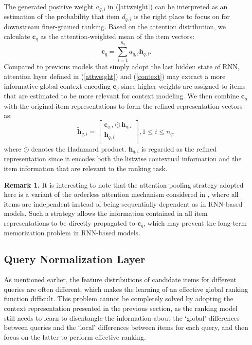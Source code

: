\documentclass[letterpaper]{article}
\begin{document}
The generated positive weight ${{a}_{q,i}}$ in (\ref{attweight}) can be interpreted as an estimation of the probability that item ${{d}_{q,i}}$ is the right place to focus on for downstream finer-grained ranking. Based on the attention distribution, we calculate ${{\mathbf{c}}_{q}}$ as the attention-weighted mean of the item vectors:
\begin{equation}
\label{context}
{{\mathbf{c}}_{q}}=\sum\limits_{i=1}^{{{n}_{q}}}{{{a}_{q,i}}{{\mathbf{h}}_{q,i}}}.
\end{equation}
Compared to previous models that simply adopt the last hidden state of RNN, attention layer defined in (\ref{attweight}) and (\ref{context}) may extract a more informative global context encoding ${{\mathbf{c}}_{q}}$ since higher weights are assigned to items that are estimated to be more relevant for context modeling. We then combine ${{\mathbf{c}}_{q}}$ with the original item representations to form the refined representation vectors as:
\begin{equation}
\label{latentcross}
{{\widetilde{\mathbf{h}}}_{q,i}}=\left[ \begin{matrix}
{\mathbf{c}_{q,i}}\odot{{\mathbf{h}}_{q,i}}  \\
{{\mathbf{h}}_{q,i}}  \\
\end{matrix} \right],1\le i\le {{n}_{q}},
\end{equation}
where $\odot$ denotes the Hadamard product. ${{\widetilde{\mathbf{h}}}_{q,i}}$ is regarded as the refined representation since it encodes both the listwise contextual information and the item information that are relevant to the ranking task.

\noindent \textbf{Remark 1.} It is interesting to note that the attention pooling strategy adopted here is a variant of the orderless attention mechanism considered in \cite{OrderlessAttention,lin2017structured}, where all items are independent instead of being sequentially dependent as in RNN-based models. Such a strategy allows the information contained in all item representations to be directly propagated to ${{\mathbf{c}}_{q}}$, which may prevent the long-term memorization problem in RNN-based models.

\subsection{Query Normalization Layer}

As mentioned earlier, the feature distributions of candidate items for different queries are often different, which makes the learning of an effective global ranking function difficult. This problem cannot be completely solved by adopting the context representation presented in the previous section, as the ranking model still needs to learn to disentangle the information about the `global' differences between queries and the `local' differences between items for each query, and then focus on the latter to perform effective ranking.
\end{document}
